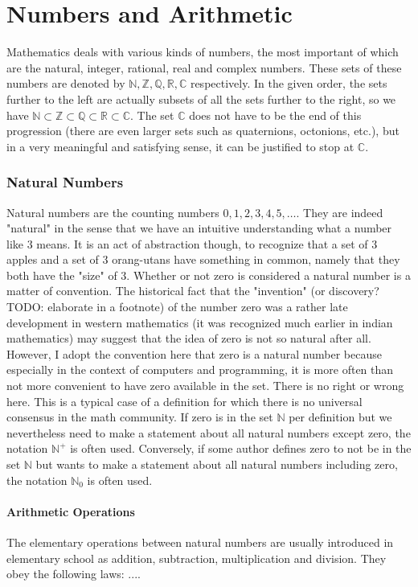 \section{Numbers and Arithmetic} 

Mathematics deals with various kinds of numbers, the most important of which are the natural, integer, rational, real and complex numbers. These sets of these numbers are denoted by  $\mathbb{N,Z,Q,R,C}$ respectively. In the given order, the sets further to the left are actually subsets of all the sets further to the right, so we have $\mathbb{N \subset Z \subset Q \subset R \subset C}$. The set $\mathbb{C}$ does not have to be the end of this progression (there are even larger sets such as quaternions, octonions, etc.), but in a very meaningful and satisfying sense, it can be justified to stop at $\mathbb{C}$.

\subsubsection{Natural Numbers}
Natural numbers are the counting numbers $0,1,2,3,4,5,\ldots$. They are indeed "natural" in the sense that we have an intuitive understanding what a number like $3$ means. It is an act of abstraction though, to recognize that a set of 3 apples and a set of 3 orang-utans have something in common, namely that they both have the "size" of 3. Whether or not zero is considered a natural number is a matter of convention. The historical fact that the "invention" (or discovery? TODO: elaborate in a footnote) of the number zero was a rather late development in western mathematics (it was recognized much earlier in indian mathematics) may suggest that the idea of zero is not so natural after all. However, I adopt the convention here that zero is a natural number because especially in the context of computers and programming, it is more often than not more convenient to have zero available in the set. There is no right or wrong here. This is a typical case of a definition for which there is no universal consensus in the math community. If zero is in the set $\mathbb{N}$ per definition but we nevertheless need to make a statement about all natural numbers except zero, the notation $\mathbb{N}^+$ is often used. Conversely, if some author defines zero to not be in the set $\mathbb{N}$ but wants to make a statement about all natural numbers including zero, the notation $\mathbb{N}_0$ is often used.

\paragraph{Arithmetic Operations}
The elementary operations between natural numbers are usually introduced in elementary school as addition, subtraction, multiplication and division. They obey the following laws: .... 

